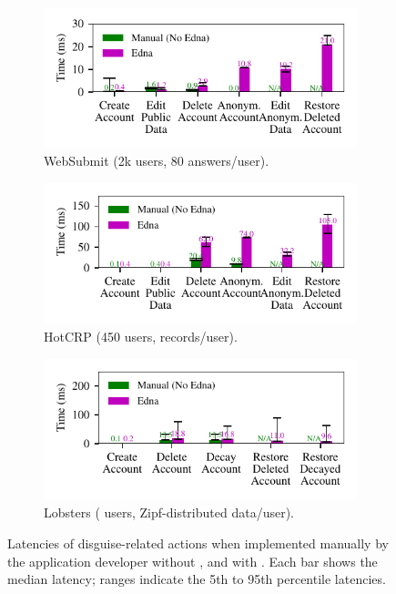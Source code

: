 \begin{figure}[t]
  \centering
  \begin{subfigure}[b]{\columnwidth}
    \includegraphics{figs/websubmit_op_stats}
    \caption{WebSubmit (2k users, 80 answers/user).}
    \label{f:ops-websubmit}
  \end{subfigure}
  \begin{subfigure}[b]{\columnwidth}
    \includegraphics{figs/hotcrp_op_stats}
    \caption{HotCRP (450 users,  records/user).}
    \label{f:ops-hotcrp}
  \end{subfigure}
  \begin{subfigure}[b]{\columnwidth}
    \includegraphics{figs/lobsters_op_stats}
    \caption{Lobsters ( users, Zipf-distributed data/user).}
    \label{f:ops-lobsters}
  \end{subfigure}
  \caption{Latencies of disguise-related actions when implemented manually by the
  application developer without \sys, and with \sys.
  Each bar shows the median latency; ranges indicate the 5th to 95th
  percentile latencies.}
  \label{fig:client_opstats}
\end{figure}

